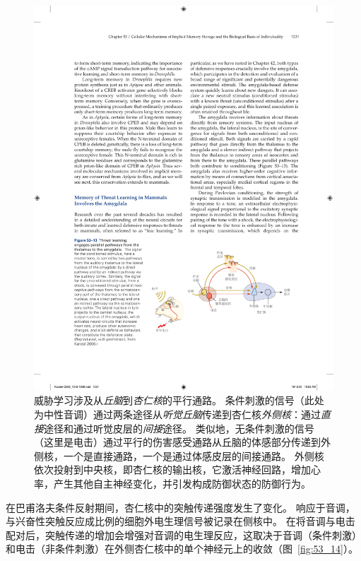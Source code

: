 \begin{figure}[htbp]
	\centering
	\includegraphics[width=0.75\linewidth]{chap53/fig_53_13}
	\caption{威胁学习涉及从\textit{丘脑}到\textit{杏仁核}的平行通路。
		条件刺激的信号（此处为中性音调）通过两条途径从\textit{听觉丘脑}传递到杏仁核\textit{外侧核}：通过\textit{直接}途径和通过听觉皮层的\textit{间接}途径。
		类似地，无条件刺激的信号（这里是电击）通过平行的伤害感受通路从丘脑的体感部分传递到外侧核，一个是直接通路，一个是通过体感皮层的间接通路。
		外侧核依次投射到中央核，即杏仁核的输出核，它激活神经回路，增加心率，产生其他自主神经变化，并引发构成防御状态的防御行为\cite{kandel2007search}。}
	\label{fig:53_13}
\end{figure}


在巴甫洛夫条件反射期间，杏仁核中的突触传递强度发生了变化。
响应于音调，与兴奋性突触反应成比例的细胞外电生理信号被记录在侧核中。
在将音调与电击配对后，突触传递的增加会增强对音调的电生理反应，这取决于音调（条件刺激）和电击（非条件刺激）在外侧杏仁核中的单个神经元上的收敛（图~\ref{fig:53_14}）。


